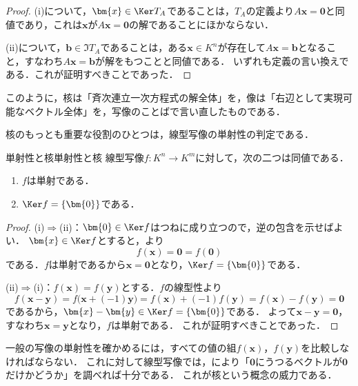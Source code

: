 \begin{leftbar}
\begin{proof}
  (i)について，$\bm{x} \in \Ker T_A$であることは，$T_A$の定義より$A\bm{x} = \bm{0}$と同値であり，これは$\bm{x}$が$A\bm{x} = \bm{0}$の解であることにほかならない．

  (ii)について，$\bm{b} \in \Im T_A$であることは，ある$\bm{x} \in K^n$が存在して$A\bm{x} = \bm{b}$となること，すなわち$A\bm{x} = \bm{b}$が解をもつことと同値である．
  いずれも定義の言い換えである．これが証明すべきことであった．
\end{proof}
\end{leftbar}

このように，核は「斉次連立一次方程式の解全体」を，像は「右辺として実現可能なベクトル全体」を，写像のことばで言い直したものである．

核のもっとも重要な役割のひとつは，線型写像の単射性の判定である．

\begin{prop}{単射性と核}{単射性と核}
  線型写像$f \colon K^n \to K^m$に対して，次の二つは同値である．
  \begin{enumerate}[label=(\roman*),leftmargin=3.2em]
    \item $f$は単射である．
    \item $\Ker f = \{\bm{0}\}$である．
  \end{enumerate}
\end{prop}

\begin{leftbar}
\begin{proof}
  (i)$\Rightarrow$(ii)：$\bm{0} \in \Ker f$はつねに成り立つので，逆の包含を示せばよい．
  $\bm{x} \in \Ker f$とすると，より
  \[
    f(\bm{x}) = \bm{0} = f(\bm{0})
  \]
  である．$f$は単射であるから$\bm{x} = \bm{0}$となり，$\Ker f = \{\bm{0}\}$である．

  (ii)$\Rightarrow$(i)：$f(\bm{x}) = f(\bm{y})$とする．$f$の線型性より
  \[
    f(\bm{x} - \bm{y}) = f\bigl(\bm{x} + (-1)\bm{y}\bigr) = f(\bm{x}) + (-1)f(\bm{y}) = f(\bm{x}) - f(\bm{y}) = \bm{0}
  \]
  であるから，$\bm{x} - \bm{y} \in \Ker f = \{\bm{0}\}$である．
  よって$\bm{x} - \bm{y} = \bm{0}$，すなわち$\bm{x} = \bm{y}$となり，$f$は単射である．
  これが証明すべきことであった．
\end{proof}
\end{leftbar}

一般の写像の単射性を確かめるには，すべての値の組$f(\bm{x})$，$f(\bm{y})$を比較しなければならない．
これに対して線型写像では，により「$\bm{0}$にうつるベクトルが$\bm{0}$だけかどうか」を調べれば十分である．
これが核という概念の威力である．

